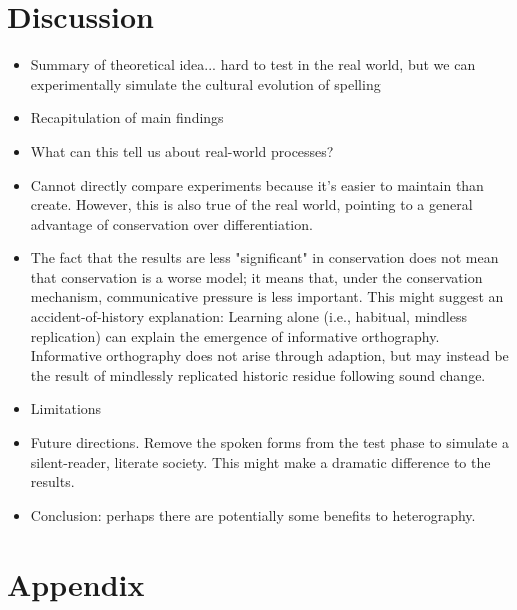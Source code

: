 \documentclass[doc,biblatex]{apa7}
\begin{document}

\section{Discussion}

\begin{itemize}

	\item Summary of theoretical idea... hard to test in the real world, but we can experimentally simulate the cultural evolution of spelling

	\item Recapitulation of main findings

	\item What can this tell us about real-world processes?

	\item Cannot directly compare experiments because it's easier to maintain than create. However, this is also true of the real world, pointing to a general advantage of conservation over differentiation.

	\item The fact that the results are less "significant" in conservation does not mean that conservation is a worse model; it means that, under the conservation mechanism, communicative pressure is less important. This might suggest an accident-of-history explanation: Learning alone (i.e., habitual, mindless replication) can explain the emergence of informative orthography. Informative orthography does not arise through adaption, but may instead be the result of mindlessly replicated historic residue following sound change.

	\item Limitations

	\item Future directions. Remove the spoken forms from the test phase to simulate a silent-reader, literate society. This might make a dramatic difference to the results.

	\item Conclusion: perhaps there are potentially some benefits to heterography.

\end{itemize}

\section{Appendix}
\end{document}
